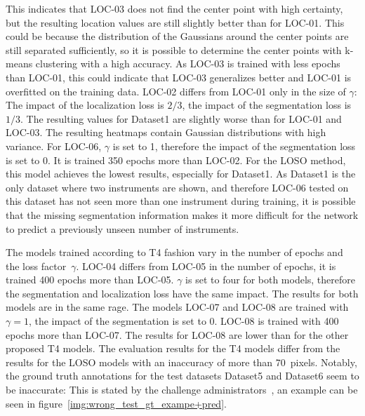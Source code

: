 This indicates that LOC-03 does not find the center point with high certainty, but the resulting location values are still slightly better than for LOC-01. This could be because the distribution of the Gaussians around the center points are still separated sufficiently, so it is possible to determine the center points with k-means clustering with a high accuracy. As LOC-03 is trained with less epochs than LOC-01, this could indicate that LOC-03 generalizes better and LOC-01 is overfitted on the training data.
LOC-02 differs from LOC-01 only in the size of $\gamma$: The impact of the localization loss is $2/3$, the impact of the segmentation loss is $1/3$.
The resulting values for Dataset1 are slightly worse than for LOC-01 and LOC-03. The resulting heatmaps contain Gaussian distributions with high variance.
For LOC-06, $\gamma$ is set to 1, therefore the impact of the segmentation loss is set to 0. It is trained 350 epochs more than LOC-02. For the LOSO method, this model achieves the lowest results, especially for Dataset1. As Dataset1 is the only dataset where two instruments are shown, and therefore LOC-06 tested on this dataset has not seen more than one instrument during training, it is possible that the missing segmentation information makes it more difficult for the network to predict a previously unseen number of instruments.

The models trained according to T4 fashion vary in the number of epochs and the loss factor~$\gamma$.
LOC-04 differs from LOC-05 in the number of epochs, it is trained 400 epochs more than LOC-05. $\gamma$ is set to four for both models, therefore the segmentation and localization loss have the same impact. The results for both models are in the same rage.
The models LOC-07 and LOC-08 are trained with $\gamma=1$, the impact of the segmentation is set to 0. LOC-08 is trained with 400 epochs more than LOC-07. The results for LOC-08 are lower than for the other proposed T4 models.
The evaluation results for the T4 models differ from the results for the LOSO models with an inaccuracy of more than 70~pixels. Notably, the ground truth annotations for the test datasets Dataset5 and Dataset6 seem to be inaccurate: This is stated by the challenge administrators~\cite{Laina2017}, an example can be seen in figure~\ref{img:wrong_test_gt_exampe+pred}. %

